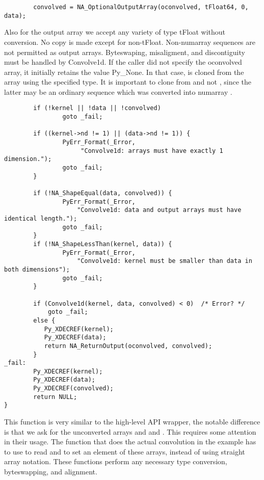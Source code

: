 \begin{verbatim}
        convolved = NA_OptionalOutputArray(oconvolved, tFloat64, 0, data);
\end{verbatim}

Also for the output array we accept any variety of type tFloat without
conversion.  No copy is made except for non-tFloat.  Non-numarray sequences are
not permitted as output arrays.  Byteswaping, misaligment, and discontiguity
must be handled by Convolve1d.  If the \python caller did not specify the
oconvolved array, it initially retains the value Py_None.  In that case,
 is cloned from the array  using the specified type.
It is important to clone from  and not , since the latter
may be an ordinary \python sequence which was converted into numarray
.  

\begin{verbatim}
        if (!kernel || !data || !convolved)
                goto _fail;

        if ((kernel->nd != 1) || (data->nd != 1)) {
                PyErr_Format(_Error,
                     "Convolve1d: arrays must have exactly 1 dimension.");
                goto _fail;
        }

        if (!NA_ShapeEqual(data, convolved)) {
                PyErr_Format(_Error,
                    "Convolve1d: data and output arrays must have identical length.");
                goto _fail;
        }
        if (!NA_ShapeLessThan(kernel, data)) {
                PyErr_Format(_Error,
                    "Convolve1d: kernel must be smaller than data in both dimensions");
                goto _fail;
        }
        
        if (Convolve1d(kernel, data, convolved) < 0)  /* Error? */
            goto _fail;
        else {
           Py_XDECREF(kernel);
           Py_XDECREF(data);
           return NA_ReturnOutput(oconvolved, convolved);
        }
_fail:
        Py_XDECREF(kernel);
        Py_XDECREF(data);
        Py_XDECREF(convolved);
        return NULL;
}

\end{verbatim}

This function is very similar to the high-level API wrapper, the notable
difference is that we ask for the unconverted arrays  and
 and .  This requires some attention in their usage.
The function that does the actual convolution in the example has to use
 to read and  to set an element of these
arrays, instead of using straight array notation.  These functions perform any
necessary type conversion, byteswapping, and alignment.

